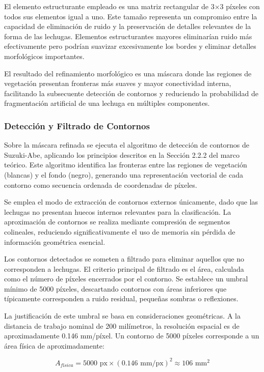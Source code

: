 El elemento estructurante empleado es una matriz rectangular de 3×3 píxeles con todos sus elementos igual a uno. Este tamaño representa un compromiso entre la capacidad de eliminación de ruido y la preservación de detalles relevantes de la forma de las lechugas. Elementos estructurantes mayores eliminarían ruido más efectivamente pero podrían suavizar excesivamente los bordes y eliminar detalles morfológicos importantes.

El resultado del refinamiento morfológico es una máscara donde las regiones de vegetación presentan fronteras más suaves y mayor conectividad interna, facilitando la subsecuente detección de contornos y reduciendo la probabilidad de fragmentación artificial de una lechuga en múltiples componentes.

\subsubsection{Detección y Filtrado de Contornos}

Sobre la máscara refinada se ejecuta el algoritmo de detección de contornos de Suzuki-Abe, aplicando los principios descritos en la Sección 2.2.2 del marco teórico. Este algoritmo identifica las fronteras entre las regiones de vegetación (blancas) y el fondo (negro), generando una representación vectorial de cada contorno como secuencia ordenada de coordenadas de píxeles.

Se emplea el modo de extracción de contornos externos únicamente, dado que las lechugas no presentan huecos internos relevantes para la clasificación. La aproximación de contornos se realiza mediante compresión de segmentos colineales, reduciendo significativamente el uso de memoria sin pérdida de información geométrica esencial.

Los contornos detectados se someten a filtrado para eliminar aquellos que no corresponden a lechugas. El criterio principal de filtrado es el área, calculada como el número de píxeles encerrados por el contorno. Se establece un umbral mínimo de 5000 píxeles, descartando contornos con áreas inferiores que típicamente corresponden a ruido residual, pequeñas sombras o reflexiones.

La justificación de este umbral se basa en consideraciones geométricas. A la distancia de trabajo nominal de 200 milímetros, la resolución espacial es de aproximadamente 0.146 mm/píxel. Un contorno de 5000 píxeles corresponde a un área física de aproximadamente:

\begin{equation}
A_{física} = 5000 \text{ px} \times (0.146 \text{ mm/px})^2 \approx 106 \text{ mm}^2
\end{equation}

